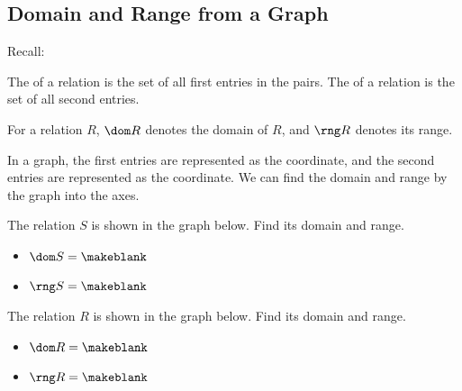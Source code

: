\subsection{Domain and Range from a Graph} 
Recall:
\begin{definition}
The  of a relation is the set of all first entries in the pairs. The  of a relation is the set of all second entries.

For a relation $R$, $\dom R$ denotes the domain of $R$, and $\rng R$ denotes its range.
\end{definition}
In a graph, the first entries are represented as the \makeblanksmall coordinate, and the second entries are represented as the \makeblanksmall coordinate. We can find the domain and range by  \makeblank[1.5in] the graph into the axes.
\begin{Example}
The relation $S$ is shown in the graph below. Find its domain and range.
\begin{itemize}
\item $\dom S = \makeblank$
\item $\rng S = \makeblank$
\end{itemize}
\begin{flushright}
\end{flushright}
\end{Example}
\begin{Example}
The relation $R$ is shown in the graph below. Find its domain and range.
\begin{itemize}
\item $\dom R = \makeblank$
\item $\rng R = \makeblank$
\end{itemize}
\begin{flushright}
\end{flushright}
\end{Example}
